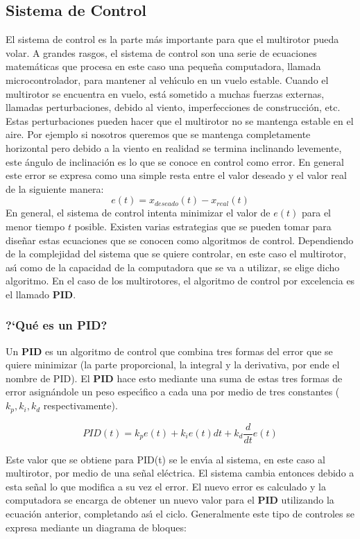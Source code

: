 \documentclass[journal]{IEEEtran}
\begin{document}
\subsection{Sistema de Control}
El sistema de control  es la parte m\'as importante para que el multirotor pueda volar. A grandes rasgos, el sistema de control son una serie de ecuaciones matem\'aticas que procesa en este caso una peque\~na computadora, llamada microcontrolador, para mantener al veh{\'\i}culo en un vuelo estable.
Cuando el multirotor se encuentra en vuelo, est\'a sometido a muchas fuerzas externas, llamadas perturbaciones, debido al viento, imperfecciones de construcci\'on, etc. Estas perturbaciones pueden hacer que el multirotor no se mantenga estable en el aire. Por ejemplo si nosotros queremos que se mantenga completamente horizontal pero debido a la viento en realidad se termina inclinando levemente, este \'angulo de inclinaci\'on es lo que se conoce en control como error. En general este error se expresa como una simple resta entre el valor deseado y el valor real de la siguiente manera:
\[ e(t)=x_{deseado}(t)-x_{real}(t) \]
En general, el sistema de control intenta minimizar el valor de $e(t)$ para el menor tiempo $t$ posible.
Existen varias estrategias que se pueden tomar para dise\~nar estas ecuaciones que se conocen como algoritmos de control. Dependiendo de la complejidad del sistema que se quiere controlar, en este caso el multirotor, as{\'\i} como de la capacidad de la computadora que se va a utilizar, se elige dicho algoritmo.
En el caso de los multirotores, el algoritmo de control por excelencia es el llamado \textbf{PID}. 

\subsubsection{{?`}Qu\'e es un PID?}
Un \textbf{PID} es un algoritmo de control que combina tres formas del error que se quiere minimizar (la parte proporcional, la integral y la derivativa, por ende el nombre de PID). El \textbf{PID} hace esto mediante una suma de estas tres formas de error asign\'andole un peso espec{\'\i}fico a cada una por medio de tres constantes ($k_p, k_i, k_d$ respectivamente).

\[PID(t)=k_p e(t) + k_i e(t) dt + k_d \frac{d}{dt} e(t)\]

Este valor que se obtiene para PID(t) se le env{\'\i}a al sistema, en este caso al multirotor, por medio de una se\~nal el\'ectrica. El sistema cambia entonces debido a esta se\~nal lo que modifica a su vez el error. El nuevo error es calculado y la computadora se encarga de obtener un nuevo valor para el \textbf{PID} utilizando la ecuaci\'on anterior, completando as{\'\i} el ciclo. 
Generalmente este tipo de controles se expresa mediante un diagrama de bloques:
\end{document}
